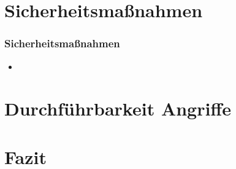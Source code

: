 \documentclass{beamer}
\begin{document}
\section{Sicherheitsmaßnahmen}
\begin{frame}
\frametitle{Sicherheitsmaßnahmen}

\begin{itemize}
	\item 
\end{itemize}
\end{frame}

\section{Durchführbarkeit Angriffe}
\begin{frame}
\frametitle{}

\end{frame}

\section{Fazit}
\begin{frame}
\frametitle{}

\end{frame}
\end{document}

